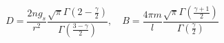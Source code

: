\begin{equation}
D=\frac{2ng_s}{r^2}
\frac{\sqrt{\pi}\Gamma (2-\frac{\gamma}{2})}
{\Gamma (\frac{3-\gamma}{2})},\quad 
B=\frac{4\pi m}{l}
\frac{\sqrt{\pi}\Gamma (\frac{\gamma +1}{2})}{\Gamma (\frac{\gamma}{2})}
\label{emg}
\end{equation}

